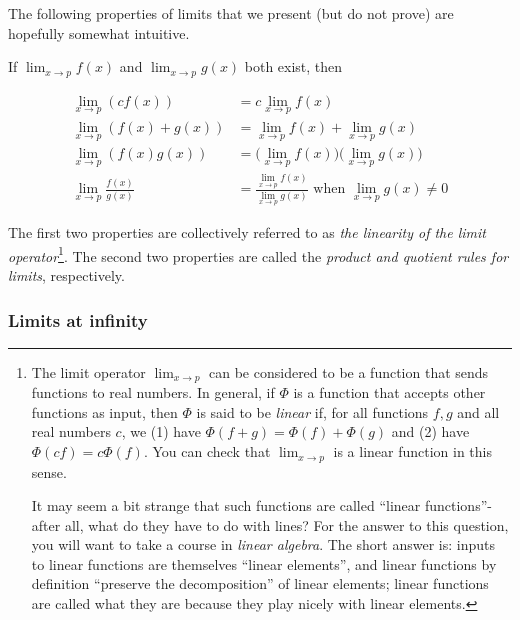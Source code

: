 \documentclass{article}
\begin{document}
The following properties of limits that we present (but do not prove) are hopefully somewhat intuitive.

\vspace{.25cm}

If $\lim_{x \rightarrow p} f(x)$ and $\lim_{x \rightarrow p} g(x)$ both exist, then

\begin{align*}
    \lim_{x \rightarrow p} (c f(x)) &= c \lim_{x \rightarrow p} f(x) \\
    \lim_{x \rightarrow p} (f(x) + g(x)) &= \lim_{x \rightarrow p} f(x) + \lim_{x \rightarrow p} g(x) \\
    \lim_{x \rightarrow p} (f(x) g(x)) &= \Big( \lim_{x \rightarrow p} f(x) \Big) \Big( \lim_{x \rightarrow p} g(x) \Big) \\
    \lim_{x \rightarrow p} \frac{f(x)}{g(x)} &= \frac{\lim_{x \rightarrow p} f(x)}{\lim_{x \rightarrow p} g(x)} \text{ when } \lim_{x \rightarrow p} g(x) \neq 0
\end{align*}

The first two properties are collectively referred to as \textit{the linearity of the limit operator}\footnote{The limit operator $\lim_{x \rightarrow p}$ can be considered to be a function that sends functions to real numbers. In general, if $\Phi$ is a function that accepts other functions as input, then $\Phi$ is said to be \textit{linear} if, for all functions $f, g$ and all real numbers $c$, we (1) have $\Phi(f + g) = \Phi(f) + \Phi(g)$ and (2) have $\Phi(cf) = c\Phi(f)$. You can check that $\lim_{x \rightarrow p}$ is a linear function in this sense.

It may seem a bit strange that such functions are called ``linear functions''- after all, what do they have to do with lines? For the answer to this question, you will want to take a course in \textit{linear algebra}. The short answer is: inputs to linear functions are themselves ``linear elements'', and linear functions by definition ``preserve the decomposition'' of linear elements; linear functions are called what they are because they play nicely with linear elements.}. The second two properties are called the \textit{product and quotient rules for limits}, respectively.
    
\subsubsection*{Limits at infinity}
\end{document}
